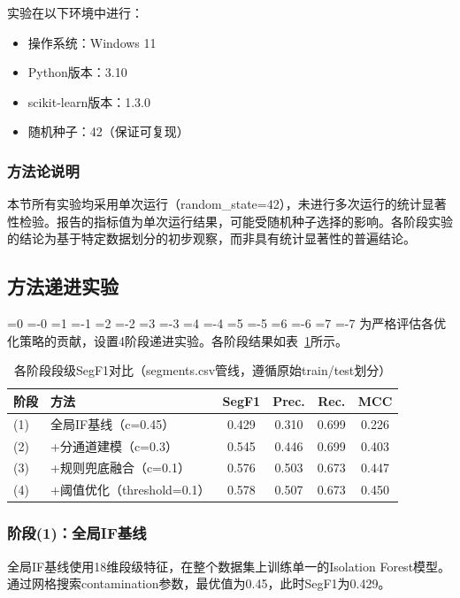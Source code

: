 \documentclass[12pt, a4paper]{article}
\newcommand{\zihao}[1]{%
    \ifnum#1=0 {\fontsize{42pt}{50pt}\selectfont}%
    \else\ifnum#1=-0 {\fontsize{36pt}{44pt}\selectfont}%
    \else\ifnum#1=1 {\fontsize{26pt}{32pt}\selectfont}%
    \else\ifnum#1=-1 {\fontsize{24pt}{28pt}\selectfont}%
    \else\ifnum#1=2 {\fontsize{22pt}{26pt}\selectfont}%
    \else\ifnum#1=-2 {\fontsize{18pt}{22pt}\selectfont}%
    \else\ifnum#1=3 {\fontsize{16pt}{20pt}\selectfont}%
    \else\ifnum#1=-3 {\fontsize{15pt}{18pt}\selectfont}%
    \else\ifnum#1=4 {\fontsize{14pt}{17pt}\selectfont}%
    \else\ifnum#1=-4 {\fontsize{12pt}{15pt}\selectfont}%
    \else\ifnum#1=5 {\fontsize{10.5pt}{13pt}\selectfont}%
    \else\ifnum#1=-5 {\fontsize{9pt}{11pt}\selectfont}%
    \else\ifnum#1=6 {\fontsize{7.5pt}{9pt}\selectfont}%
    \else\ifnum#1=-6 {\fontsize{6.5pt}{8pt}\selectfont}%
    \else\ifnum#1=7 {\fontsize{5.5pt}{7pt}\selectfont}%
    \else\ifnum#1=-7 {\fontsize{5pt}{6pt}\selectfont}%
    \fi\fi\fi\fi\fi\fi\fi\fi\fi\fi\fi\fi\fi\fi\fi\fi
}
\newcommand{\songti}{\CJKfontspec{SimSun}}
\begin{document}
实验在以下环境中进行：
\begin{itemize}
    \item 操作系统：Windows 11
    \item Python版本：3.10
    \item scikit-learn版本：1.3.0
    \item 随机种子：42（保证可复现）
\end{itemize}

\subsubsection{方法论说明}

本节所有实验均采用单次运行（random\_state=42），未进行多次运行的统计显著性检验。报告的指标值为单次运行结果，可能受随机种子选择的影响。各阶段实验的结论为基于特定数据划分的初步观察，而非具有统计显著性的普遍结论。

\subsection{方法递进实验}

\zihao{5}\songti
为严格评估各优化策略的贡献，设置4阶段递进实验。各阶段结果如表~\ref{tab:stages}所示。

\begin{table}[H]
\centering
\caption{各阶段段级SegF1对比（segments.csv管线，遵循原始train/test划分）}
\label{tab:stages}
\begin{tabular}{llcccc}
\toprule
阶段 & 方法 & SegF1 & Prec. & Rec. & MCC \\
\midrule
(1) & 全局IF基线（c=0.45） & 0.429 & 0.310 & 0.699 & 0.226 \\
(2) & +分通道建模（c=0.3） & 0.545 & 0.446 & 0.699 & 0.403 \\
(3) & +规则兜底融合（c=0.1） & 0.576 & 0.503 & 0.673 & 0.447 \\
(4) & +阈值优化（threshold=0.1） & 0.578 & 0.507 & 0.673 & 0.450 \\
\bottomrule
\end{tabular}
\end{table}

\subsubsection{阶段(1)：全局IF基线}

全局IF基线使用18维段级特征，在整个数据集上训练单一的Isolation Forest模型。通过网格搜索contamination参数，最优值为0.45，此时SegF1为0.429。
\end{document}
